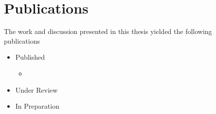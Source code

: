 \documentclass[../main.tex]{subfiles}
\begin{document}
\section{Publications}
The work and discussion presented in this thesis yielded the following publications
\begin{itemize}
  \item Published
        \begin{itemize}[label=$\bullet$]
          \item {}
        \end{itemize}
  \item Under Review
  \item In Preparation
\end{itemize}



\printbibliography
\end{document}

